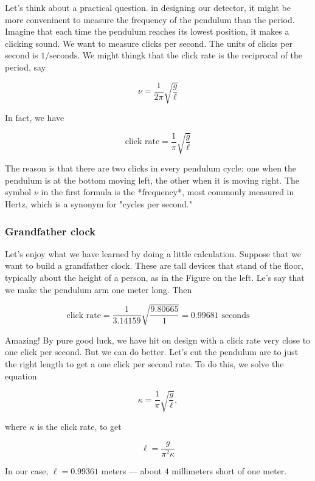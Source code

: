 Let's think about a practical question.  in designing our detector, it might be more conveninent to measure the frequency of the pendulum than the period.  Imagine that each time the pendulum reaches its lowest position, it makes a clicking sound.  We want to measure clicks per second.  The units of clicks per second is $1/\text{seconds}$.  We might thingk that the click rate is the reciprocal of the period, say

$$
\nu = \frac{1}{2\pi}\sqrt{\frac{g}{\ell}}
$$ 

In fact, we have

$$
\text{click rate} = \frac{1}{\pi}\sqrt{\frac{g}{\ell}}
$$ 

The reason is that there are two clicks in every pendulum cycle: one when the pendulum is at the bottom moving left, the other when it is moving right.  The symbol $\nu$ in the first formula is the *frequency*, most commonly measured in Hertz, which is a synonym for "cycles per second."

\subsubsection{Grandfather clock }



 Let's enjoy what we have learned by doing a little calculation.  Suppose that we want to build a grandfather clock.  These are tall devices that stand of the floor,  typically about the height of a person, as in the Figure on the left.  Le's say that we make the pendulum arm one meter long.  Then

$$
\text{click rate} = \frac{1}{3.14159}\sqrt{\frac{9.80665}{1}} = 0.99681 \text{ seconds}
$$ 

Amazing!  By pure good luck, we have hit on design with a click rate very close to one click per second.  But we can do better.  Let's cut the pendulum are to just the right length to get a one click per second rate.  To do this, we solve the equation

$$
\kappa = \frac{1}{\pi}\sqrt{\frac{g}{\ell}},
$$

where $\kappa$ is the click rate, to get 

$$
\ell = \frac{g}{\pi^2 \kappa}
$$

In our case, $\ell = 0.99361$ meters — about $4$ millimeters short of one meter.


